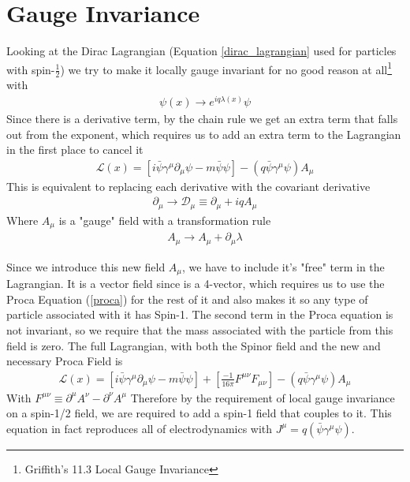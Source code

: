 \section{Gauge Invariance}\label{gauge-inv}
Looking at the Dirac Lagrangian (Equation \ref{dirac_lagrangian} used for particles with spin-$\frac{1}{2}$) we try to make it locally gauge invariant for no good reason at all\footnote{Griffith's 11.3 Local Gauge Invariance} with
\begin{align}
\psi(x) \rightarrow e^{iq\lambda(x)}\psi
\end{align}
Since there is a derivative term, by the chain rule we get an extra term that falls out from the exponent, which requires us to add an extra term to the Lagrangian in the first place to cancel it
\begin{align}
    \mathcal{L}(x) = [i\bar{\psi}\gamma^\mu\partial_\mu\psi - m\bar{\psi}\psi] - (q\bar{\psi}\gamma^\mu\psi)A_\mu
\end{align}
This is equivalent to replacing each derivative with the covariant derivative
\begin{align}
\partial_\mu \rightarrow \mathcal{D}_\mu \equiv \partial_\mu +iqA_\mu
\end{align}
Where $A_\mu$ is a "gauge" field with a transformation rule
\begin{align}\label{gauge-transform}
A_\mu \rightarrow A_\mu + \partial_\mu\lambda
\end{align}

Since we introduce this new field $A_\mu$, we have to include it's "free" term in the Lagrangian. It is a vector field since is a 4-vector, which requires us to use the Proca Equation (\ref{proca}) for the rest of it and also makes it so any type of particle associated with it has Spin-1. The second term in the Proca equation is not invariant, so we require that the mass associated with the particle from this field is zero. The full Lagrangian, with both the Spinor field and the new and necessary Proca Field is
\begin{align}
\mathcal{L}(x) = [i\bar{\psi}\gamma^\mu\partial_\mu\psi - m\bar{\psi}\psi] + \left[\frac{-1}{16\pi}F^{\mu\nu}F_{\mu\nu}\right]- (q\bar{\psi}\gamma^\mu\psi)A_\mu
\end{align}
With $F^{\mu\nu}\equiv \partial^\mu A^\nu - \partial^\nu A^\mu$ Therefore by the requirement of local gauge invariance on a spin-1/2 field, we are required to add a spin-1 field that couples to it. This equation in fact reproduces all of electrodynamics with $J^\mu = q(\bar{\psi}\gamma^\mu\psi)$.

